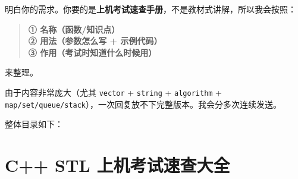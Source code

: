 \documentclass[10pt,twocolumn]{extarticle}
\begin{document}
\setcounter{page}{1}  %
\setcounter{tocdepth}{2} 

\tableofcontents

\clearpage %

\setcounter{page}{1}   %

明白你的需求。你要的是\textbf{上机考试速查手册}，不是教材式讲解，所以我会按照：

\begin{quote}
\textbf{① 名称（函数/知识点） \\
② 用法（参数怎么写 + 示例代码） \\
③ 作用（考试时知道什么时候用）}
\end{quote}

来整理。

由于内容非常庞大（尤其 \texttt{vector} + \texttt{string} + \texttt{algorithm} + \texttt{map/set/queue/stack}），一次回复放不下完整版本。我会分多次连续发送。

整体目录如下：

\section*{C++ STL 上机考试速查大全}
\end{document}
